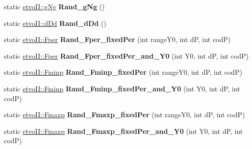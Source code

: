 \begin{DoxyCompactItemize}
static \mbox{\hyperlink{classetvo_i_i_1_1g_ng}{etvo\+I\+I\+::g\+Ng}} {\bfseries Rand\+\_\+g\+Ng} ()
\item 
\mbox{\label{classetvo_i_i_1_1rand_gen_a6765c9abd785a0f192d62943556ab7b6}} 
static \mbox{\hyperlink{classetvo_i_i_1_1d_dd}{etvo\+I\+I\+::d\+Dd}} {\bfseries Rand\+\_\+d\+Dd} ()
\item 
\mbox{\label{classetvo_i_i_1_1rand_gen_a80f77da93edc9515d518c539f1cc468c}} 
static \mbox{\hyperlink{classetvo_i_i_1_1_fper}{etvo\+I\+I\+::\+Fper}} {\bfseries Rand\+\_\+\+Fper\+\_\+fixed\+Per} (int range\+Y0, int dP, int codP)
\item 
\mbox{\label{classetvo_i_i_1_1rand_gen_a04868fddf9b38dafb1840cfe02a11416}} 
static \mbox{\hyperlink{classetvo_i_i_1_1_fper}{etvo\+I\+I\+::\+Fper}} {\bfseries Rand\+\_\+\+Fper\+\_\+fixed\+Per\+\_\+and\+\_\+\+Y0} (int Y0, int dP, int codP)
\item 
\mbox{\label{classetvo_i_i_1_1rand_gen_ab3e1bdffd58ebfffac344243d78a6038}} 
static \mbox{\hyperlink{classetvo_i_i_1_1_fminp}{etvo\+I\+I\+::\+Fminp}} {\bfseries Rand\+\_\+\+Fminp\+\_\+fixed\+Per} (int range\+Y0, int dP, int codP)
\item 
\mbox{\label{classetvo_i_i_1_1rand_gen_a0752ba7864ee9adde6340a6def1d4379}} 
static \mbox{\hyperlink{classetvo_i_i_1_1_fminp}{etvo\+I\+I\+::\+Fminp}} {\bfseries Rand\+\_\+\+Fminp\+\_\+fixed\+Per\+\_\+and\+\_\+\+Y0} (int Y0, int dP, int codP)
\item 
\mbox{\label{classetvo_i_i_1_1rand_gen_ae27f1bbeb708fda85e6e4a23a3905401}} 
static \mbox{\hyperlink{classetvo_i_i_1_1_fmaxp}{etvo\+I\+I\+::\+Fmaxp}} {\bfseries Rand\+\_\+\+Fmaxp\+\_\+fixed\+Per} (int range\+Y0, int dP, int codP)
\item 
\mbox{\label{classetvo_i_i_1_1rand_gen_a95a221a53fe9084bde09080d9d9ceffe}} 
static \mbox{\hyperlink{classetvo_i_i_1_1_fmaxp}{etvo\+I\+I\+::\+Fmaxp}} {\bfseries Rand\+\_\+\+Fmaxp\+\_\+fixed\+Per\+\_\+and\+\_\+\+Y0} (int Y0, int dP, int codP)
\item 
\mbox{\label{classetvo_i_i_1_1rand_gen_a74c0a6e99d5aaed5b42008064d2f24da}} 

\end{DoxyCompactItemize}
